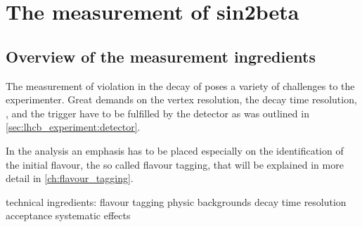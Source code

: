 
\chapter{The measurement of sin2beta}
\label{ch:measurement_of_sin2beta}

\section{Overview of the measurement ingredients}
\label{sec:measurement_of_sin2beta:overview}

The measurement of \CP violation in the decay of \BdToJpsiKS poses a variety of
challenges to the experimenter. Great demands on the vertex resolution, the
decay time resolution, \PID, and the trigger have to be fulfilled by the \LHCb
detector as was outlined in \cref{sec:lhcb_experiment:detector}.

In the analysis an emphasis has to be placed especially on the identification of
the initial \Bmeson flavour, the so called flavour tagging, that will be
explained in more detail in \cref{ch:flavour_tagging}. 

technical ingredients:
flavour tagging
physic backgrounds
decay time resolution
acceptance
systematic effects















